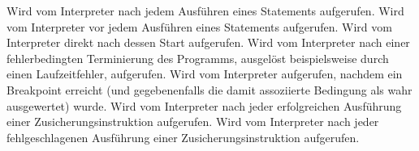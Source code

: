 \begin{description}
    Wird vom Interpreter nach jedem Ausführen eines Statements aufgerufen.
    Wird vom Interpreter vor jedem Ausführen eines Statements aufgerufen.
    Wird vom Interpreter direkt nach dessen Start aufgerufen.
    Wird vom Interpreter nach einer fehlerbedingten Terminierung des Programms, ausgelöst beispielsweise durch einen Laufzeitfehler, aufgerufen.
    Wird vom Interpreter aufgerufen, nachdem ein Breakpoint erreicht (und gegebenenfalls die damit assoziierte Bedingung als wahr ausgewertet) wurde.
    Wird vom Interpreter nach jeder erfolgreichen Ausführung einer Zusicherungsinstruktion aufgerufen.
    Wird vom Interpreter nach jeder fehlgeschlagenen Ausführung einer Zusicherungsinstruktion aufgerufen.
\end{description}
